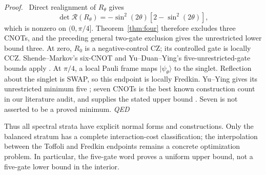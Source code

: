 \documentclass[a4paper,onecolumn,11pt,unpublished]{quantumarticle}
\newenvironment{proof}[1][Proof]{\par\noindent\textit{#1.}\ }{\hfill\textit{QED}\par}
\begin{document}
\begin{proof}
Direct realignment of $R_\theta$ gives
\begin{equation}\label{eq:reflectionminor}
 \det\mathcal R(R_\theta)=-\sin^2(2\theta)[2-\sin^2(2\theta)],
\end{equation}
which is nonzero on $(0,\pi/4]$. Theorem~\ref{thm:four} therefore excludes
three CNOTs, and the preceding general two-gate exclusion gives the
unrestricted lower bound three.
At zero, $R_0$ is a negative-control CZ; its controlled gate is locally
CCZ. Shende--Markov's six-CNOT and Yu--Duan--Ying's five-unrestricted-gate
bounds apply \cite{toffolicnot,yuduan}. At $\pi/4$, a local Pauli frame maps
$|\psi_\theta\rangle$ to the singlet. Reflection about the singlet is SWAP,
so this endpoint is locally Fredkin. Yu--Ying gives its unrestricted
minimum five \cite{yuying}; seven CNOTs is the best known construction count in our literature
audit, and supplies the stated upper bound \cite{fredkinshallow}. Seven is not asserted to be a proved minimum.
\end{proof}
Thus all spectral strata have explicit normal forms and constructions.
Only the balanced stratum has a complete interaction-cost classification;
the interpolation between the Toffoli and Fredkin endpoints remains a concrete
optimization problem. In particular, the five-gate word proves a uniform
upper bound, not a five-gate lower bound in the interior.
\end{document}
